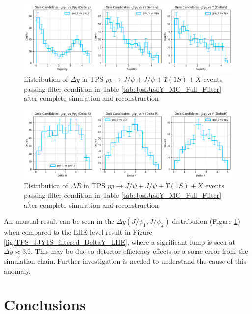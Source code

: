 \documentclass[10pt,twocolumn]{article}
\begin{document}
\begin{figure}
    \centering
    \includegraphics[width=1.0\linewidth]{images/Ntuple_LEVEL_TPS_DeltaY_filtered.png}
    \caption{Distribution of $\Delta y$ in TPS $pp\to J/\psi+J/\psi+\Upsilon(1S)+X$ events passing filter condition in Table \ref{tab:JpsiJpsiY_MC_Full_Filter} after complete simulation and reconstruction}
    \label{fig:TPS_JJY1S_filtered_DeltaY_Ntuple}
\end{figure}

\begin{figure}
    \centering
    \includegraphics[width=1.0\linewidth]{images/Ntuple_LEVEL_TPS_DeltaR_filtered.png}
    \caption{Distribution of $\Delta R$ in TPS $pp\to J/\psi+J/\psi+\Upsilon(1S)+X$ events passing filter condition in Table \ref{tab:JpsiJpsiY_MC_Full_Filter} after complete simulation and reconstruction}
    \label{fig:TPS_JJY1S_filtered_DeltaR_Ntuple}
\end{figure}

An unusual result can be seen in the $\Delta y (J/\psi_1, J/\psi_2)$ distribution (Figure \ref{fig:TPS_JJY1S_filtered_DeltaY_Ntuple}) when compared to the LHE-level result in Figure \ref{fig:TPS_JJY1S_filtered_DeltaY_LHE}, where a significant lump is seen at $\Delta y \approx 3.5$. This may be due to detector efficiency effects or a some error from the simulation chain. Further investigation is needed to understand the cause of this anomaly.

\section{Conclusions}
\end{document}
